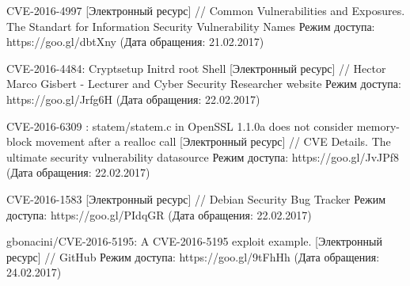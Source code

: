 \begin{thebibliography}{00}
    CVE-2016-4997
    [Электронный ресурс] //
    Common Vulnerabilities and Exposures. The Standart for Information Security Vulnerability Names
    Режим доступа: https://goo.gl/dbtXny
    (Дата обращения: 21.02.2017)

    CVE-2016-4484: Cryptsetup Initrd root Shell
    [Электронный ресурс] //
    Hector Marco Gisbert - Lecturer and Cyber Security Researcher website
    Режим доступа: https://goo.gl/Jrfg6H
    (Дата обращения: 22.02.2017)

    CVE-2016-6309 : statem/statem.c in OpenSSL 1.1.0a does not consider memory-block movement after a realloc call
    [Электронный ресурс] //
    CVE Details. The ultimate security vulnerability datasource
    Режим доступа: https://goo.gl/JvJPf8
    (Дата обращения: 22.02.2017)

    CVE-2016-1583
    [Электронный ресурс] //
    Debian Security Bug Tracker
    Режим доступа: https://goo.gl/PIdqGR
    (Дата обращения: 22.02.2017)

    gbonacini/CVE-2016-5195: A CVE-2016-5195 exploit example.
    [Электронный ресурс] //
    GitHub
    Режим доступа: https://goo.gl/9tFhHh
    (Дата обращения: 24.02.2017)

\end{thebibliography}
\endgroup

\clearpage
